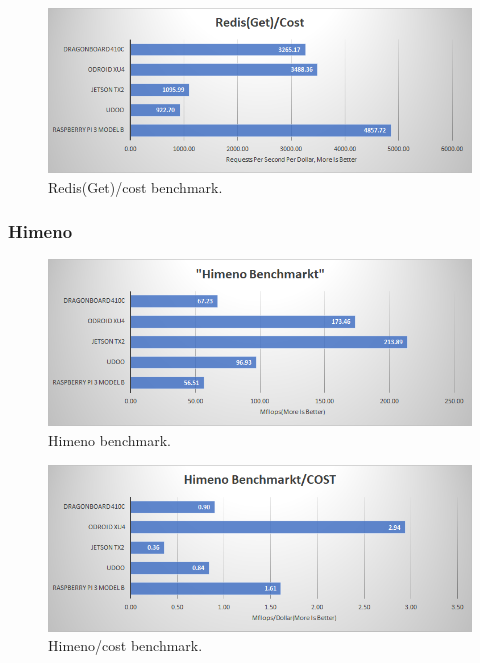 \documentclass[english]{book_template} %
\begin{document}
\begin{figure}[H]
\center
\caption{Redis(Get)/cost benchmark.\label{fig:redisGet_cost}}
\includegraphics[scale=1]{./resultphoronix/redisGet_cost.png}
\end{figure}

\subsubsection{Himeno}

\begin{figure}[H]
\center
\caption{Himeno benchmark.\label{fig:himeno}}
\includegraphics[scale=1]{./resultphoronix/himeno.png}
\end{figure}

\begin{figure}[H]
\center
\caption{Himeno/cost benchmark.\label{fig:himeno_cost}}
\includegraphics[scale=1]{./resultphoronix/himeno_cost.png}
\end{figure}
\end{document}

